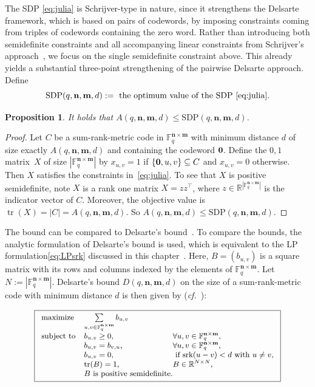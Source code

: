 \documentclass[a4paper]{article}
\newtheorem{proposition}[formula]{Proposition}
\newcommand{\R}{\mathbb{R}}
\newcommand{\F}{\mathbb{F}}
\newcommand{\bfn}{\mathbf {n}}
\newcommand{\bfm}{\mathbf {m}}
\newcommand{\spac}{\F^{\bfn\times\bfm}_q}
\newcommand{\srk}{\mathrm{srk}}
\newcommand{\Del}{D(q,\bfn,\bfm,d)}
\DeclareMathOperator{\tr}{tr}
\begin{document}
The SDP \eqref{eq:julia} is Schrijver-type in nature, since it strengthens the Delsarte framework, which is based on pairs of codewords, by imposing constraints coming from triples of codewords containing the zero word. Rather than introducing both semidefinite constraints and all accompanying linear constraints from Schrijver’s approach~\cite{S2005}, we focus on the single semidefinite constraint above. This already yields a substantial three-point strengthening of the pairwise Delsarte approach. Define 
$$
\mathrm{SDP}(q,\bfn,\bfm,d) := \text{ the optimum value of the SDP~\eqref{eq:julia}}.
$$
\begin{proposition}
It holds that $ A(q,\bfn,\bfm,d) \leq \mathrm{SDP}(q,\bfn,\bfm,d)$.
\end{proposition}
\begin{proof}
Let $C$ be a sum-rank-metric code in $\F^{\bfn\times\bfm}_q$ with minimum distance $d$ of size exactly $A(q,\bfn,\bfm,d)$ and containing the codeword $\bf 0$. Define the $0,1$ matrix~$X$ of size $|\spac|$ by 
$x_{u,v} =1$ if $\{{\bf 0}, u, v\}\subseteq C$ and $x_{u,v}=0$ otherwise. Then $X$ satisfies the constraints in~\eqref{eq:julia}. To see that $X$ is positive semidefinite, note $X$ is a rank one matrix $X=zz^\top$, where $z \in \R^{|\spac|}$ is the indicator vector of $C$. Moreover, the objective value is  $\tr(X)=|C|=A(q,\bfn,\bfm,d)$. So $ A(q,\bfn,\bfm,d) \leq \mathrm{SDP}(q,\bfn,\bfm,d)$.
\end{proof}

The bound can be compared to Delsarte's bound~\cite{DelsarteLP}. 
To compare the bounds, the analytic formulation of Delsarte's bound is used, which is equivalent to the LP formulation\:\eqref{eq:LPsrk} discussed in this chapter~\cite{S79}. Here, $B=(b_{u,v})$ is a square matrix with its rows and columns indexed by the elements of $\spac$. Let $N:=|\spac|$. Delsarte's bound $\Del$ on the size of a sum-rank-metric code with minimum distance $d$ is then given by (\emph{cf.}~\cite[Eq.\:(22)]{S79}):

\begin{equation}\label{eq:DelLP_sdp}
\boxed{
\small
\begin{array}{ll@{}l}
\text{maximize}  &\sum\limits_{u,v\in \spac} b_{u,v} &\\
\text{subject to} &b_{u,v}\geq0,~&\forall u,v\in\spac,\\
&b_{u,v} = b_{v,u},~&\forall u,v\in\spac,\\
&b_{u,v}=0,~& \text{ if }\srk(u-v)<d\text{ with }u\neq v,\\
&\tr(B)=1,~&B\in\mathbb{R}^{N\times N},\\
&B\text{ is positive semidefinite.}
\end{array}
}
\end{equation}
\end{document}
